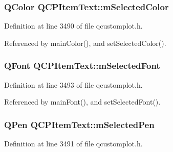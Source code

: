 \hypertarget{class_q_c_p_item_text_a7eb64e42f5f7998a97d8907ad25933c1}{}
\subsubsection[{m\+Selected\+Color}]{\setlength{\rightskip}{0pt plus 5cm}Q\+Color Q\+C\+P\+Item\+Text\+::m\+Selected\+Color\hspace{0.3cm}{\ttfamily [protected]}}\label{class_q_c_p_item_text_a7eb64e42f5f7998a97d8907ad25933c1}


Definition at line 3490 of file qcustomplot.\+h.



Referenced by main\+Color(), and set\+Selected\+Color().

\hypertarget{class_q_c_p_item_text_a6702f141fae590b2f4f1ec02fe9f8bd5}{}
\subsubsection[{m\+Selected\+Font}]{\setlength{\rightskip}{0pt plus 5cm}Q\+Font Q\+C\+P\+Item\+Text\+::m\+Selected\+Font\hspace{0.3cm}{\ttfamily [protected]}}\label{class_q_c_p_item_text_a6702f141fae590b2f4f1ec02fe9f8bd5}


Definition at line 3493 of file qcustomplot.\+h.



Referenced by main\+Font(), and set\+Selected\+Font().

\hypertarget{class_q_c_p_item_text_a8eaec649606d6ead2d8d4dcb5691777c}{}
\subsubsection[{m\+Selected\+Pen}]{\setlength{\rightskip}{0pt plus 5cm}Q\+Pen Q\+C\+P\+Item\+Text\+::m\+Selected\+Pen\hspace{0.3cm}{\ttfamily [protected]}}\label{class_q_c_p_item_text_a8eaec649606d6ead2d8d4dcb5691777c}


Definition at line 3491 of file qcustomplot.\+h.



